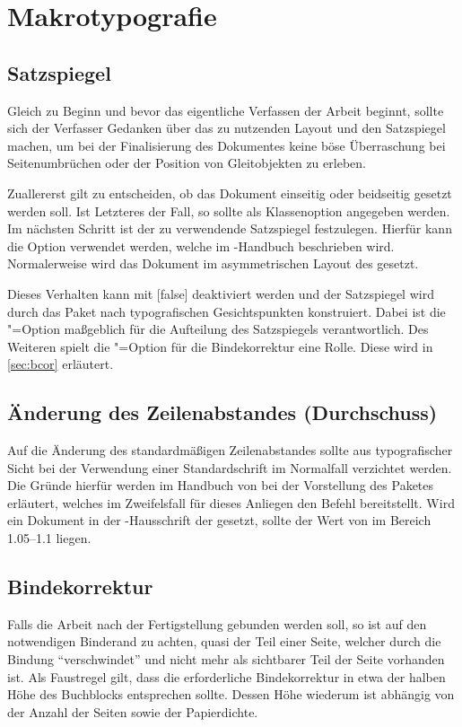 \documentclass[%
  english,ngerman,%
  cdgeometry=no,DIV=12,automark,%
]{tudscrartcl}
\begin{document}
\section{Makrotypografie}
\subsection{Satzspiegel}
Gleich zu Beginn und bevor das eigentliche Verfassen der Arbeit beginnt, sollte 
sich der Verfasser Gedanken über das zu nutzenden Layout und den Satzspiegel 
machen, um bei der Finalisierung des Dokumentes keine böse Überraschung bei 
Seitenumbrüchen oder der Position von Gleitobjekten zu erleben.

Zuallererst gilt zu entscheiden, ob das Dokument einseitig oder beidseitig 
gesetzt werden soll. Ist Letzteres der Fall, so sollte  als 
Klassenoption angegeben werden. Im nächsten Schritt ist der zu verwendende 
Satzspiegel festzulegen. Hierfür kann die Option  verwendet 
werden, welche im \TUDScript-Handbuch beschrieben wird. Normalerweise wird das 
Dokument im asymmetrischen Layout des \CDs gesetzt.

Dieses Verhalten kann mit [false] deaktiviert werden und 
der Satzspiegel wird durch das Paket  nach typografischen 
Gesichtspunkten konstruiert. Dabei ist die \KOMAScript"=Option  
maßgeblich für die Aufteilung des Satzspiegels verantwortlich. Des Weiteren 
spielt die \KOMAScript"=Option  für die Bindekorrektur eine Rolle. 
Diese wird in \autoref{sec:bcor} erläutert.

\subsection{Änderung des Zeilenabstandes (Durchschuss)}
Auf die Änderung des standardmäßigen Zeilenabstandes sollte aus typografischer 
Sicht bei der Verwendung einer Standardschrift im Normalfall verzichtet werden. 
Die Gründe hierfür werden im Handbuch von \TUDScript bei der Vorstellung des 
Paketes  erläutert, welches im Zweifelsfall für dieses 
Anliegen den Befehl  bereitstellt. Wird ein Dokument in der 
\Univers-Hausschrift der \TnUD gesetzt, sollte der Wert von  
im Bereich 1.05--1.1 liegen.

\subsection{Bindekorrektur}
\label{sec:bcor}
Falls die Arbeit nach der Fertigstellung gebunden werden soll, so ist auf den 
notwendigen Binderand zu achten, quasi der Teil einer Seite, welcher durch die 
Bindung \enquote{verschwindet} und nicht mehr als sichtbarer Teil der Seite 
vorhanden ist. Als Faustregel gilt, dass die erforderliche Bindekorrektur in 
etwa der halben Höhe des Buchblocks entsprechen sollte. Dessen Höhe wiederum 
ist abhängig von der Anzahl der Seiten sowie der Papierdichte.
\end{document}
